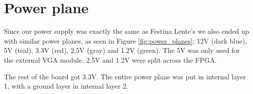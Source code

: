 \section {Power plane}



Since our power supply was exactly the same as Festina Lente's we also ended up
with similar power planes, as seen in Figure \ref{fig:power_planes}; 12V (dark blue), 5V (teal), 
3.3V (red), 2.5V (gray) and 1.2V (green). The 5V was only used for the external 
\ac{VGA} module. 2.5V and 1.2V were split across the \ac{FPGA}.

The rest of the board got 3.3V. The entire power plane was put in internal layer
1, with a ground layer in internal layer 2.
